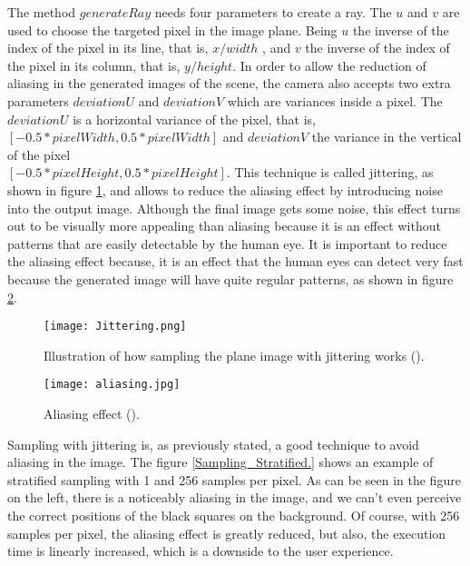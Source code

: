 \par
The method
$generateRay$
needs four parameters to create a ray.
The $u$ and $v$
are used to choose the targeted pixel in the image plane.
Being
$u$
the inverse of the index of the pixel in its line, that is,
$x / width$
, and
$v$
the inverse of the index of the pixel in its column, that is,
$y / height$.
In order to allow the reduction of aliasing in the generated images of the scene, the camera also accepts two extra parameters
$deviationU$ and $deviationV$
which are variances inside a pixel.
The
$deviationU$
is a horizontal variance of the pixel, that is,\\
$[-0.5*pixelWidth, 0.5*pixelWidth]$
and
$deviationV$ the variance in the vertical of the pixel\\
$[-0.5*pixelHeight, 0.5*pixelHeight]$.
This technique is called jittering, as shown in figure \ref{Jittering.}, and allows to reduce the aliasing effect by introducing noise into the output image.
Although the final image gets some noise, this effect turns out to be visually more appealing than aliasing because it is an effect without patterns that are easily detectable by the human eye.
It is important to reduce the aliasing effect because, it is an effect that the human eyes can detect very fast because the generated image will have quite regular patterns, as shown in figure \ref{Aliased.}.

\begin{figure}[H]
	\centering
	\caption{Illustration of how sampling the plane image with jittering works (\cite{Jittering}).}
	\label{Jittering.}
	\texttt{[image: Jittering.png]}
\end{figure}

\begin{figure}[H]
	\centering
	\caption{Aliasing effect (\cite{Aliasing}).}
	\label{Aliased.}
	\texttt{[image: aliasing.jpg]}
\end{figure}


\par
Sampling with jittering is, as previously stated, a good technique to avoid aliasing in the image.
The figure \ref{Sampling_Stratified.} shows an example of stratified sampling with 1 and 256 samples per pixel.
As can be seen in the figure on the left, there is a noticeably aliasing in the image, and we can't even perceive the correct positions of the black squares on the background.
Of course, with 256 samples per pixel, the aliasing effect is greatly reduced, but also, the execution time is linearly increased, which is a downside to the user experience.

